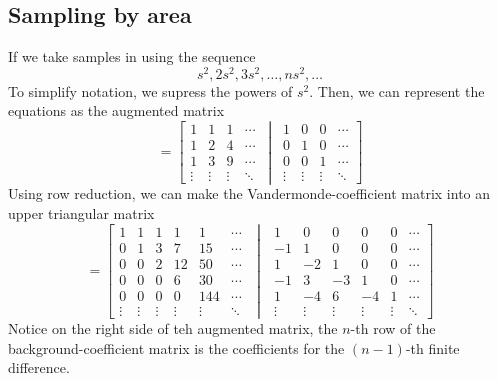 \documentclass{article}
\begin{document}
\subsection{Sampling by area}
If we take samples in using the sequence
\[s^2, 2s^2, 3s^2,\dots, ns^2,\dots\]
To simplify notation, we supress the powers of \(s^2\). Then, we can represent the equations as the augmented matrix
\begin{equation}
	[S\vert I]=\left[ \begin{matrix}1 & 1 & 1 & \cdots \\ 1 & 2 & 4 & \cdots\\	1 & 3 & 9 & \cdots\\ \vdots & \vdots & \vdots & \ddots \end{matrix}\,\middle\vert\,\begin{matrix}1 & 0 & 0 & \cdots \\ 0 & 1 & 0 & \cdots \\ 0 & 0 & 1 & \cdots \\ \vdots & \vdots & \vdots & \ddots\end{matrix}\right]
\end{equation}
Using row reduction, we can make the Vandermonde-coefficient matrix into an upper triangular matrix
\begin{equation}
	[T\vert C]=\left[\begin{matrix} 1 & 1 & 1 & 1 & 1 & \cdots \\
			0 & 1 & 3 & 7 & 15 &\cdots \\
			0 & 0 & 2 & 12 & 50 &\cdots \\
			0 & 0 & 0 & 6 & 30 & \cdots \\
			0 & 0 & 0 & 0 & 144 & \cdots \\
		\vdots & \vdots & \vdots & \vdots & \vdots & \ddots \end{matrix}
		\,\,\middle\vert\,\,\begin{matrix}
			1 & 0 & 0 & 0 & 0 & \cdots \\
			-1 & 1 & 0 & 0 & 0 & \cdots \\
			1 & -2 & 1 & 0 & 0 & \cdots \\
			-1 & 3 & -3 & 1 & 0 & \cdots \\
			1 & -4 & 6 & -4 & 1 & \cdots \\
			\vdots & \vdots & \vdots & \vdots & \vdots & \ddots
	\end{matrix}\right]
\end{equation}
Notice on the right side of teh augmented matrix, the \(n\)-th row of the background-coefficient matrix is the coefficients for the \((n-1)\)-th finite difference.
\end{document}

